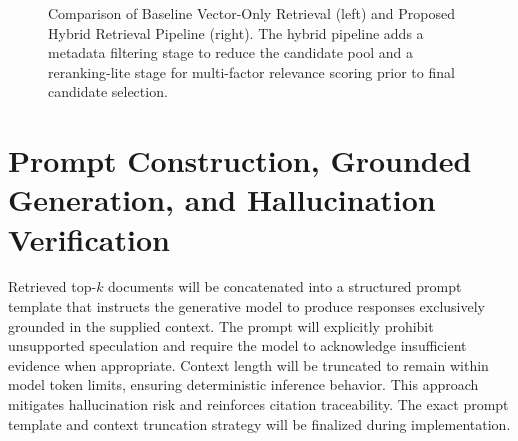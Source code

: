 \documentclass[12pt,a4paper]{report}
\begin{document}
\begin{figure}[H]
\caption{Comparison of Baseline Vector-Only Retrieval (left) and Proposed Hybrid Retrieval Pipeline (right). The hybrid pipeline adds a metadata filtering stage to reduce the candidate pool and a reranking-lite stage for multi-factor relevance scoring prior to final candidate selection.}
\label{fig:retrieval_comparison}
\end{figure}

\section{Prompt Construction, Grounded Generation, and Hallucination Verification}
\label{sec:prompt}

Retrieved top-$k$ documents will be concatenated into a structured prompt template that instructs the generative model to produce responses exclusively grounded in the supplied context. The prompt will explicitly prohibit unsupported speculation and require the model to acknowledge insufficient evidence when appropriate. Context length will be truncated to remain within model token limits, ensuring deterministic inference behavior. This approach mitigates hallucination risk and reinforces citation traceability. The exact prompt template and context truncation strategy will be finalized during implementation.
\end{document}
